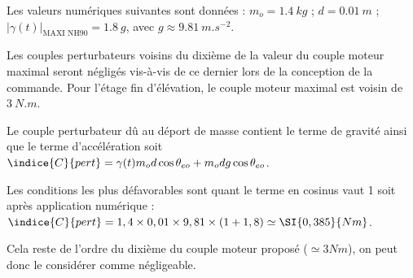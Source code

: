 Les valeurs numériques suivantes sont données : $m_o =\SI{1,4}{kg}$ ; $d= \SI{0,01}{m}$ ; $\vert \gamma(t)\vert_{\text{MAXI NH90}} = \SI{1,8}{g}$, avec $g\approx  \SI{9,81}{m.s^{-2}}$.

Les couples perturbateurs voisins du dixième de la valeur du couple moteur maximal seront négligés vis-à-vis
de ce dernier lors de la conception de la commande. Pour l'étage fin d'élévation, le couple moteur maximal est
voisin de $\SI{3}{N.m}$.

\ifprof
\begin{corrige}
Le couple perturbateur dû au déport de masse contient le terme de gravité ainsi que le terme d'accélération soit 
$\indice{C}{pert} = \gamma(t) m_o d \cos\theta_{eo}+m_o d g \cos\theta_{eo}$.

Les conditions les plus défavorables sont quant le terme en cosinus vaut 1 soit après application numérique :
$\indice{C}{pert} = 1,4 \times 0,01 \times 9,81 \times (1+1,8) \simeq \SI{0,385}{Nm}$.

Cela reste de l'ordre du dixième du couple moteur  proposé ($\simeq{3}{Nm}$), on peut donc le considérer comme négligeable.
\end{corrige}
\else
\fi
